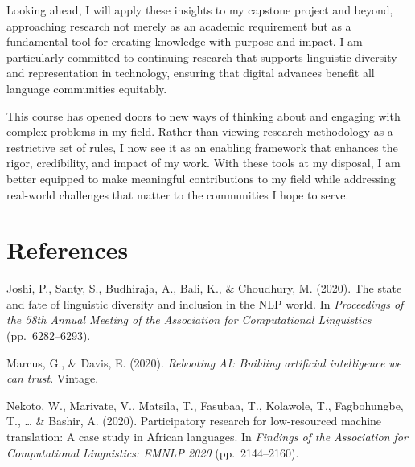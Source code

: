 \documentclass[
]{article}
\begin{document}
Looking ahead, I will apply these insights to my capstone project and
beyond, approaching research not merely as an academic requirement but
as a fundamental tool for creating knowledge with purpose and impact. I
am particularly committed to continuing research that supports
linguistic diversity and representation in technology, ensuring that
digital advances benefit all language communities equitably.

This course has opened doors to new ways of thinking about and engaging
with complex problems in my field. Rather than viewing research
methodology as a restrictive set of rules, I now see it as an enabling
framework that enhances the rigor, credibility, and impact of my work.
With these tools at my disposal, I am better equipped to make meaningful
contributions to my field while addressing real-world challenges that
matter to the communities I hope to serve.

\newpage

\section*{References}\label{references}

Joshi, P., Santy, S., Budhiraja, A., Bali, K., \& Choudhury, M. (2020).
The state and fate of linguistic diversity and inclusion in the NLP
world. In \emph{Proceedings of the 58th Annual Meeting of the
Association for Computational Linguistics} (pp.~6282--6293).

Marcus, G., \& Davis, E. (2020). \emph{Rebooting AI: Building artificial
intelligence we can trust}. Vintage.

Nekoto, W., Marivate, V., Matsila, T., Fasubaa, T., Kolawole, T.,
Fagbohungbe, T., \ldots{} \& Bashir, A. (2020). Participatory research
for low-resourced machine translation: A case study in African
languages. In \emph{Findings of the Association for Computational
Linguistics: EMNLP 2020} (pp.~2144--2160).
\end{document}

